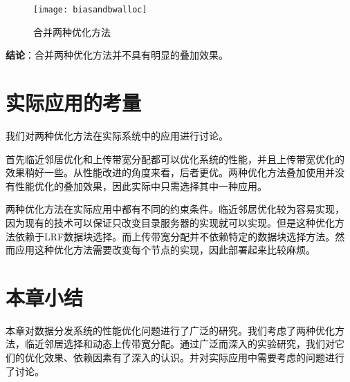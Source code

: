 \begin{figure}
  \centering
  \begin{minipage}{0.6\linewidth}
    \centering
    \texttt{[image: biasandbwalloc]}
    \caption{合并两种优化方法}
    \label{fig:biasandbwalloc}
  \end{minipage}
\end{figure}

\textbf{结论}：合并两种优化方法并不具有明显的叠加效果。


\section{实际应用的考量}
\label{sec:btsuggest}

我们对两种优化方法在实际系统中的应用进行讨论。

首先临近邻居优化和上传带宽分配都可以优化系统的性能，并且上传带宽优化的
效果稍好一些。从性能改进的角度来看，后者更优。两种优化方法叠加使用并没
有性能优化的叠加效果，因此实际中只需选择其中一种应用。

两种优化方法在实际应用中都有不同的约束条件。临近邻居优化较为容易实现，
因为现有的技术可以保证只改变目录服务器的实现就可以实现。但是这种优化方
法依赖于LRF数据块选择。而上传带宽分配并不依赖特定的数据块选择方法。然
而应用这种优化方法需要改变每个节点的实现，因此部署起来比较麻烦。

\section{本章小结}
\label{sec:btconclude}

本章对数据分发系统的性能优化问题进行了广泛的研究。我们考虑了两种优化方
法，临近邻居选择和动态上传带宽分配。通过广泛而深入的实验研究，我们对它
们的优化效果、依赖因素有了深入的认识。并对实际应用中需要考虑的问题进行
了讨论。
